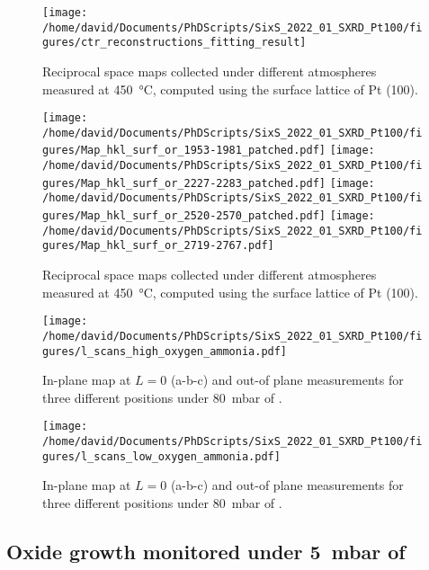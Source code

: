 \begin{figure}[!htb]
    \centering
    \texttt{[image: /home/david/Documents/PhDScripts/SixS\_2022\_01\_SXRD\_Pt100/figures/ctr\_reconstructions\_fitting\_result]}
    \caption{
        Reciprocal space maps collected under different atmospheres measured at \qty{450}{\degreeCelsius}, computed using the surface lattice of Pt (100).
    }
    \label{fig:FitPt100LScans}
\end{figure}

\begin{figure}[!htb]
    \centering
    \texttt{[image: /home/david/Documents/PhDScripts/SixS\_2022\_01\_SXRD\_Pt100/figures/Map\_hkl\_surf\_or\_1953-1981\_patched.pdf]}
    \texttt{[image: /home/david/Documents/PhDScripts/SixS\_2022\_01\_SXRD\_Pt100/figures/Map\_hkl\_surf\_or\_2227-2283\_patched.pdf]}
    \texttt{[image: /home/david/Documents/PhDScripts/SixS\_2022\_01\_SXRD\_Pt100/figures/Map\_hkl\_surf\_or\_2520-2570\_patched.pdf]}
    \texttt{[image: /home/david/Documents/PhDScripts/SixS\_2022\_01\_SXRD\_Pt100/figures/Map\_hkl\_surf\_or\_2719-2767.pdf]}
    \caption{
        Reciprocal space maps collected under different atmospheres measured at \qty{450}{\degreeCelsius}, computed using the surface lattice of Pt (100).
    }
    \label{fig:MapsPt100B}
\end{figure}

\begin{figure}[!htb]
    \centering
    \texttt{[image: /home/david/Documents/PhDScripts/SixS\_2022\_01\_SXRD\_Pt100/figures/l\_scans\_high\_oxygen\_ammonia.pdf]}
    \caption{
        In-plane map at $L=0$ (a-b-c) and out-of plane measurements for three different positions under \qty{80}{\milli\bar} of \dioxygen.
    }
    \label{fig:LScansHighOxygenAmmoniaPt100}
\end{figure}

\begin{figure}[!htb]
    \centering
    \texttt{[image: /home/david/Documents/PhDScripts/SixS\_2022\_01\_SXRD\_Pt100/figures/l\_scans\_low\_oxygen\_ammonia.pdf]}
    \caption{
        In-plane map at $L=0$ (a-b-c) and out-of plane measurements for three different positions under \qty{80}{\milli\bar} of \dioxygen.
    }
    \label{fig:LScansLowOxygenAmmoniaPt100}
\end{figure}




\subsection{Oxide growth monitored under \qty{5}{\milli\bar} of \dioxygen}

